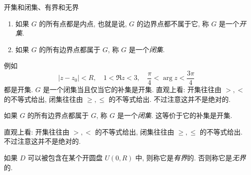 \begin{frame}{开集和闭集、有界和无界}
	\onslide<+->
	\begin{definition}[开集和闭集]
		\begin{enumerate}
			\item 如果 $G$ 的所有点都是内点, 也就是说, $G$ 的边界点都不属于它, 称 $G$ 是一个\emph{开集}.
			\item 如果 $G$ 的所有边界点都属于 $G$, 称 $G$ 是一个\emph{闭集}.
		\end{enumerate}
	\end{definition}
	\onslide<+->
	例如
	\[|z-z_0|<R,\quad 1<\Re z<3,\quad\frac\pi4<\arg z<\dfrac{3\pi}4\]
	都是开集.
	\onslide<+->
	$G$ 是一个闭集当且仅当它的补集是开集.
	\onslide<+->
	直观上看: 开集往往由 $>,<$ 的不等式给出, 闭集往往由 $\ge,\le$ 的不等式给出.
	\onslide<+->
	不过注意这并不是绝对的.

	如果 $G$ 的所有边界点都属于 $G$, 称 $G$ 是一个\emph{闭集}.
	\onslide<+->
	这等价于它的补集是开集.

	\onslide<+->
	直观上看: 开集往往由 $>,<$ 的不等式给出, 闭集往往由 $\ge,\le$ 的不等式给出.
	\onslide<+->
	不过注意这并不是绝对的.
	
	\onslide<+->
	如果 $D$ 可以被包含在某个开圆盘 $U(0,R)$ 中, 则称它是\emph{有界}的.
	\onslide<+->
	否则称它是\emph{无界}的.
\end{frame}


